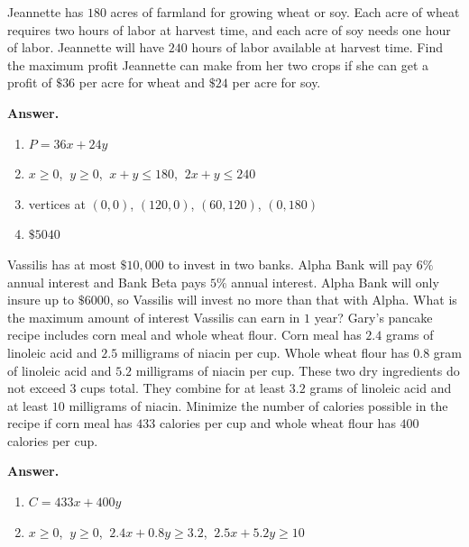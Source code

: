 \documentclass[10pt,]{book}
\theoremstyle{plain}
\theoremstyle{definition}
\theoremstyle{definition}
\theoremstyle{definition}
\numberwithin{equation}{part}
\begin{document}
\begin{exercisegroup}
\exercise[21.]\hypertarget{exercise-25}{}Jeannette has \(180\) acres of farmland for growing wheat or soy. Each acre of wheat requires two hours of labor at harvest time, and each acre of soy needs one hour of labor. Jeannette will have \(240\) hours of labor available at harvest time. Find the maximum profit Jeannette can make from her two crops if she can get a profit of \(\$36\) per acre for wheat and \(\$24\) per acre for soy.%
\par\smallskip
\noindent\textbf{Answer.}\hypertarget{answer-15}{}\quad
\leavevmode%
\begin{multicols}{2}
\begin{enumerate}[label=(\alph*)]
\item\hypertarget{li-77}{}\(P = 36x + 24y\)%
\item\hypertarget{li-78}{}\(x \ge 0\), \(~y \ge 0\), \(~x + y \le 180\), \(~2x+y\le 240\)%
\item\hypertarget{li-79}{}vertices at \((0,0)\), \((120,0)\), \((60,120)\), \((0,180) \)%
\item\hypertarget{li-80}{}\(\$5040\)%
\end{enumerate}
\end{multicols}
%
\exercise[22.]\hypertarget{exercise-26}{}Vassilis has at most \(\$10,000\) to invest in two banks. Alpha Bank will pay \(6\%\) annual interest and Bank Beta pays \(5\%\) annual interest. Alpha Bank will only insure up to \(\$6000\), so Vassilis will invest no more than that with Alpha. What is the maximum amount of interest Vassilis can earn in \(1\) year?%
\exercise[23.]\hypertarget{exercise-27}{}Gary's pancake recipe includes corn meal and whole wheat flour. Corn meal has \(2.4\) grams of linoleic acid and \(2.5\) milligrams of niacin per cup. Whole wheat flour has \(0.8\) gram of linoleic acid and \(5.2\) milligrams of niacin per cup. These two dry ingredients do not exceed \(3\) cups total. They combine for at least \(3.2\) grams of linoleic acid and at least \(10\) milligrams of niacin. Minimize the number of calories possible in the recipe if corn meal has \(433\) calories per cup and whole wheat flour has \(400\) calories per cup.%
\par\smallskip
\noindent\textbf{Answer.}\hypertarget{answer-16}{}\quad
\leavevmode%
\begin{multicols}{2}
\begin{enumerate}[label=(\alph*)]
\item\hypertarget{li-81}{}\(C = 433x + 400y\)%
\item\hypertarget{li-82}{}\(x \ge 0\), \(~y \ge 0\), \(~2.4x + 0.8y \ge 3.2\), \(~2.5x + 5.2y \ge 10\)%

\end{enumerate}
\end{multicols}
\end{exercisegroup}
\end{document}
